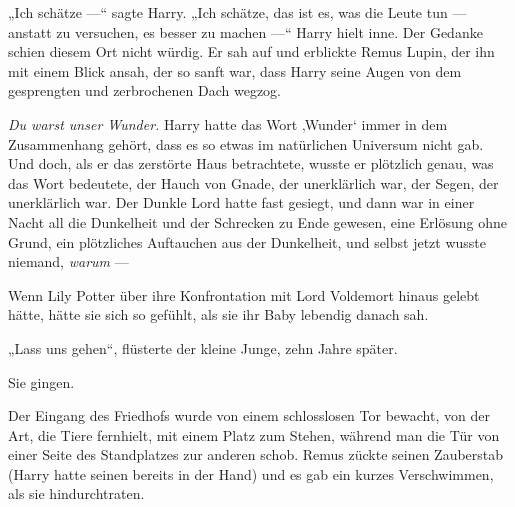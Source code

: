 „Ich schätze —“ sagte Harry.
„Ich schätze, das ist es, was die Leute tun — anstatt zu versuchen, es besser zu machen —“ Harry hielt inne. Der Gedanke schien diesem Ort nicht würdig. Er sah auf und erblickte Remus Lupin, der ihn mit einem Blick ansah, der so sanft war, dass Harry seine Augen von dem gesprengten und zerbrochenen Dach wegzog.

\emph{Du warst unser Wunder.} Harry hatte das Wort ‚Wunder‘ immer in dem Zusammenhang gehört, dass es so etwas im natürlichen Universum nicht gab. Und doch, als er das zerstörte Haus betrachtete, wusste er plötzlich genau, was das Wort bedeutete, der Hauch von Gnade, der unerklärlich war, der Segen, der unerklärlich war. Der Dunkle Lord hatte fast gesiegt, und dann war in einer Nacht all die Dunkelheit und der Schrecken zu Ende gewesen, eine Erlösung ohne Grund, ein plötzliches Auftauchen aus der Dunkelheit, und selbst jetzt wusste niemand, \emph{warum} —

Wenn Lily Potter über ihre Konfrontation mit Lord Voldemort hinaus gelebt hätte, hätte sie sich so gefühlt, als sie ihr Baby lebendig danach sah.

„Lass uns gehen“, flüsterte der kleine Junge, zehn Jahre später.

Sie gingen.

Der Eingang des Friedhofs wurde von einem schlosslosen Tor bewacht, von der Art, die Tiere fernhielt, mit einem Platz zum Stehen, während man die Tür von einer Seite des Standplatzes zur anderen schob. Remus zückte seinen Zauberstab (Harry hatte seinen bereits in der Hand) und es gab ein kurzes Verschwimmen, als sie hindurchtraten.


